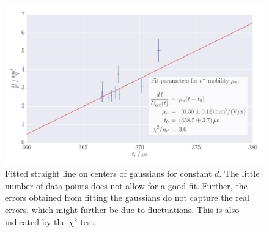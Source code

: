 \begin{figure}
    \includegraphics[width=1.0\textwidth]{figures/haynes_shockley_mu_e_U}
    \caption{
        Fitted straight line on centers of gaussians for constant $d$.  
        The little number of data points does not allow for a good fit. 
        Further, the errors obtained from fitting the gaussians do not
        capture the real errors, which might further be due to 
        fluctuations. This is also indicated by the $\chi^2$-test.
        }
    \label{fig:h_s_mu_e_d}
\end{figure}

